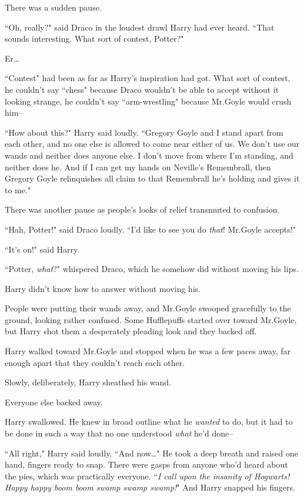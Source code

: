 There was a sudden pause.

``Oh, really?" said Draco in the loudest drawl Harry had ever heard. ``That sounds interesting. What sort of contest, Potter?"

Er{\ldots}

``Contest" had been as far as Harry's inspiration had got. What sort of contest, he couldn't say ``chess" because Draco wouldn't be able to accept without it looking strange, he couldn't say ``arm-wrestling" because Mr.\?Goyle would crush him\---

``How about this?" Harry said loudly. ``Gregory Goyle and I stand apart from each other, and no one else is allowed to come near either of us. We don't use our wands and neither does anyone else. I don't move from where I'm standing, and neither does he. And if I can get my hands on Neville's Remembrall, then Gregory Goyle relinquishes all claim to that Remembrall he's holding and gives it to me."

There was another pause as people's looks of relief transmuted to confusion.

``Hah, Potter!" said Draco loudly. ``I'd like to see you do \emph{that}! Mr.\?Goyle accepts!"

``It's on!" said Harry.

``Potter, \emph{what}?" whispered Draco, which he somehow did without moving his lips.

Harry didn't know how to answer without moving his.

People were putting their wands away, and Mr.\?Goyle swooped gracefully to the ground, looking rather confused. Some Hufflepuffs started over toward Mr.\?Goyle, but Harry shot them a desperately pleading look and they backed off.

Harry walked toward Mr.\?Goyle and stopped when he was a few paces away, far enough apart that they couldn't reach each other.

Slowly, deliberately, Harry sheathed his wand.

Everyone else backed away.

Harry swallowed. He knew in broad outline what he \emph{wanted} to do, but it had to be done in such a way that no one understood \emph{what} he'd done\---

``All right," Harry said loudly. ``And now{\ldots}" He took a deep breath and raised one hand, fingers ready to snap. There were gasps from anyone who'd heard about the pies, which was practically everyone. ``\emph{I call upon the insanity of Hogwarts! Happy happy boom boom swamp swamp swamp!}" And Harry snapped his fingers.

